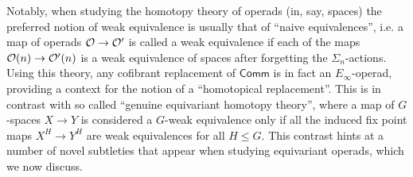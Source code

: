 \documentclass[a4paper,10pt]{article}%
\begin{document}

Notably, when studying the homotopy theory of operads
(in, say, spaces)
the preferred notion of weak equivalence is 
usually that of ``naive equivalences'',
i.e. a map of operads 
$\mathcal{O} \to \mathcal{O}'$
is called a weak equivalence if each of the maps
$\mathcal{O}(n) \to \mathcal{O}'(n)$
is a weak equivalence of spaces
after forgetting the $\Sigma_n$-actions.
Using this theory, any cofibrant replacement of $\mathsf{Comm}$ is in fact an $E_\infty$-operad, providing a context for the notion of a ``homotopical replacement''.
This is in contrast with so called ``genuine equivariant homotopy theory'', where a map of $G$-spaces $X \to Y$ is considered a $G$-weak equivalence only if all the induced fix point maps $X^H \to Y^H$ are weak equivalences for all $H \leq G$.
This contrast hints at a number of novel subtleties that appear when studying equivariant operads, which we now discuss.
\end{document}
